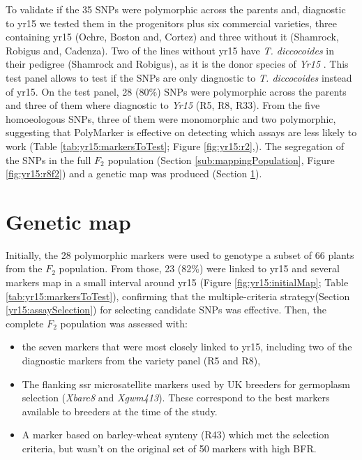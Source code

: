 To validate if the 35 SNPs were polymorphic across the parents and, diagnostic to \acrshort{yr15} we tested them in the progenitors plus six commercial varieties, three containing \acrshort{yr15} (Ochre, Boston and, Cortez) and three without it (Shamrock, Robigus and, Cadenza).
Two of the lines without \acrshort{yr15} have \textit{T. diccocoides} in their pedigree (Shamrock and Robigus), as it is the donor species of \textit{Yr15} \citep{mcintosh1995}. 
This test panel allows to test if the SNPs are only diagnostic to \textit{T. diccocoides} instead of \acrshort{yr15}.
On the test panel, 28 ($80\%$) SNPs were polymorphic across the parents and three of them where diagnostic to \textit{Yr15} (R5, R8, R33).
From the five homoeologous SNPs, three of them were monomorphic and two polymorphic, suggesting that PolyMarker is effective on detecting which assays are less likely to work (Table \ref{tab:yr15:markersToTest}; Figure \ref{fig:yr15:r2},).
The segregation of the SNPs in the full $F_{2}$ population (Section \ref{sub:mappingPopulation}, Figure \ref{fig:yr15:r8f2}) and a genetic map was produced (Section \ref{yr15:geneticMap}).   






\section{Genetic map} 
\label{yr15:geneticMap}


Initially, the 28 polymorphic markers were used to genotype a subset of 66 plants from the $F_{2}$ population. 
From those, 23 (82\%) were linked to \acrshort{yr15} and several markers map in a small interval around \acrshort{yr15} (Figure \ref{fig:yr15:initialMap}; Table \ref{tab:yr15:markersToTest}), confirming that the multiple-criteria strategy(Section \ref{yr15:assaySelection}) for selecting candidate SNPs was effective. 
Then, the complete $F_{2}$ population was assessed with:
\begin{itemize}	
	\item  the seven markers that were most closely linked to \acrshort{yr15}, including two of the diagnostic markers from the variety panel (R5 and R8),
	\item The flanking \acrshort{ssr} microsatellite markers used by UK breeders for germoplasm selection (\textit{Xbarc8} and \textit{Xgwm413}).  These correspond to the best markers available to breeders at the time of the study.
	\item A marker based on barley-wheat synteny (R43) which met the selection criteria, but wasn't on the original set of 50 markers with high BFR. 
\end{itemize}

